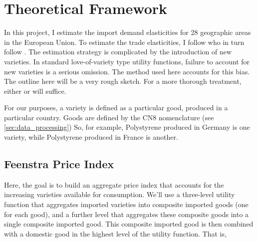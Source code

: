 \documentclass[12pt,a4paper]{article}                      %
\begin{document}



\section{Theoretical Framework}
\label{sec:theoretical_framework}
In this project, I estimate the import demand elasticities for 28 geographic areas in the European Union.
To estimate the trade elasticities, I follow \cite{broda_weinstein_2006_globalization_gains} who in turn follow \cite{feenstra_1994_new_product_varieties}.
The estimation strategy is complicated by the introduction of new varieties.
In standard love-of-variety type utility functions, failure to account for new varieties is a serious omission.
The method used here accounts for this bias.
The outline here will be a very rough sketch.  For a more thorough treatment, either \cite{feenstra_1994_new_product_varieties} or \cite{broda_weinstein_2006_globalization_gains} will suffice.

For our purposes, a variety is defined as a particular good, produced in a particular country. Goods are defined by the CN8 nomenclature (see \ref{sec:data_processing}) So, for example, Polystyrene produced in Germany is one variety, while Polystyrene produced in France is another.

\subsection{Feenstra Price Index}
\label{sub:feenstra_price_index}

Here, the goal is to build an aggregate price index that accounts for the increasing varieties available for consumption.  We'll use a three-level utility function that aggregates imported varieties into composite imported goods (one for each good), and a further level that aggregates these composite goods into a single composite imported good.  This composite imported good is then combined with a domestic good in the highest level of the utility function.  That is,
\end{document}
